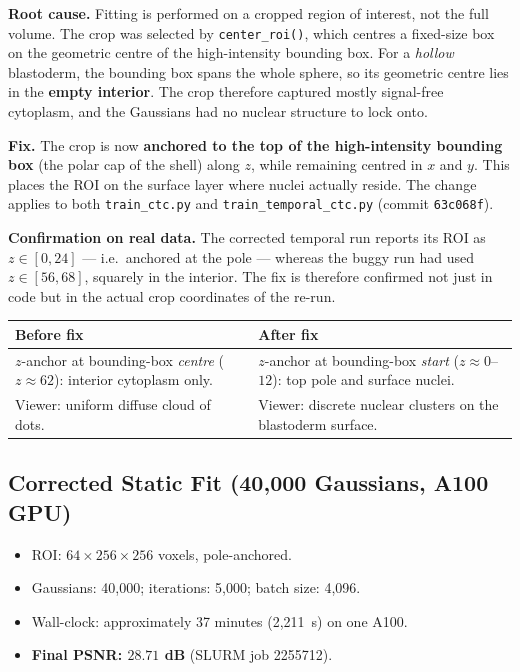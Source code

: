 \documentclass[11pt,a4paper]{article}
\newcommand{\code}[1]{\texttt{#1}}
\begin{document}
\textbf{Root cause.}
Fitting is performed on a cropped region of interest, not the full volume. The crop was
selected by \code{center\_roi()}, which centres a fixed-size box on the geometric centre
of the high-intensity bounding box. For a \emph{hollow} blastoderm, the bounding box
spans the whole sphere, so its geometric centre lies in the \textbf{empty interior}. The
crop therefore captured mostly signal-free cytoplasm, and the Gaussians had no nuclear
structure to lock onto.

\textbf{Fix.}
The crop is now \textbf{anchored to the top of the high-intensity bounding box} (the
polar cap of the shell) along \(z\), while remaining centred in \(x\) and \(y\). This
places the ROI on the surface layer where nuclei actually reside. The change applies to
both \code{train\_ctc.py} and \code{train\_temporal\_ctc.py} (commit \code{63c068f}).

\textbf{Confirmation on real data.}
The corrected temporal run reports its ROI as \(z\!\in\![0,24]\) --- i.e.\ anchored at the
pole --- whereas the buggy run had used \(z\!\in\![56,68]\), squarely in the interior. The
fix is therefore confirmed not just in code but in the actual crop coordinates of the
re-run.

\begin{table}[h!]
\centering
\small
\begin{tabularx}{\textwidth}{@{}XX@{}}
\toprule
\textbf{Before fix} & \textbf{After fix} \\
\midrule
\(z\)-anchor at bounding-box \emph{centre} (\(z \approx 62\)): interior cytoplasm only. &
\(z\)-anchor at bounding-box \emph{start} (\(z \approx 0\)--\(12\)): top pole and surface nuclei. \\
Viewer: uniform diffuse cloud of dots. &
Viewer: discrete nuclear clusters on the blastoderm surface. \\
\bottomrule
\end{tabularx}
\end{table}

\subsection{Corrected Static Fit (40{,}000 Gaussians, A100 GPU)}

\begin{itemize}
    \item ROI: \(64 \times 256 \times 256\) voxels, pole-anchored.
    \item Gaussians: 40{,}000; iterations: 5{,}000; batch size: 4{,}096.
    \item Wall-clock: approximately 37 minutes (2{,}211~s) on one A100.
    \item \textbf{Final PSNR: \(28.71\) dB} (SLURM job 2255712).
\end{itemize}
\end{document}
